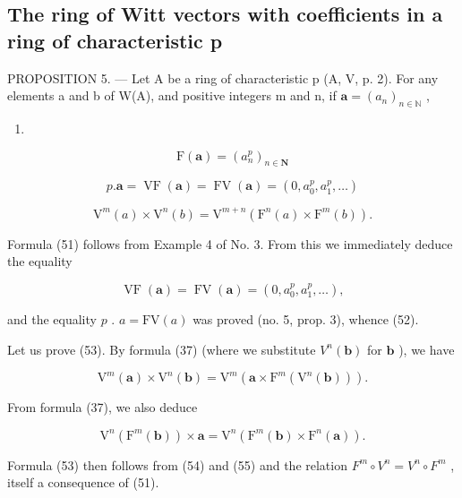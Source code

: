 \subsection{The ring of Witt vectors with coefficients in a ring of characteristic p}

PROPOSITION 5. --- Let A be a ring of characteristic p (A, V, p. 2). For any elements a and b of W(A), and positive integers m and n, if \(\boldsymbol{a} = (a_{n})_{n \in \mathbb{N}}\) ,

\begin{enumerate}
\def\labelenumi{(\arabic{enumi})}
\setcounter{enumi}{50}
\tightlist
\item
\end{enumerate}

\[
\mathrm{F} (\boldsymbol {a}) = (a _ {n} ^ {p}) _ {n \in \mathbf {N}}\tag{52}
\]

\[
p. \boldsymbol {a} = \operatorname{VF} (\boldsymbol {a}) = \operatorname{FV} (\boldsymbol {a}) = (0, a _ {0} ^ {p}, a _ {1} ^ {p}, \dots)\tag{53}
\]

\[
\mathrm{V} ^ {m} (a) \times \mathrm{V} ^ {n} (b) = \mathrm{V} ^ {m + n} (\mathrm{F} ^ {n} (a) \times \mathrm{F} ^ {m} (b)).
\]

Formula (51) follows from Example 4 of No. 3. From this we immediately deduce the equality

\[
\operatorname{VF} (\boldsymbol {a}) = \operatorname{FV} (\boldsymbol {a}) = (0, a _ {0} ^ {p}, a _ {1} ^ {p}, \dots),
\]

and the equality \(p\) . \(a = \text{FV}(a)\) was proved (no. 5, prop. 3), whence (52).

Let us prove (53). By formula (37) (where we substitute \(V^n(\boldsymbol{b})\) for \(\boldsymbol{b}\) ), we have

\[
\mathrm{V} ^ {m} (\boldsymbol {a}) \times \mathrm{V} ^ {n} (\boldsymbol {b}) = \mathrm{V} ^ {m} \left(\boldsymbol {a} \times \mathrm{F} ^ {m} \left(\mathrm{V} ^ {n} (\boldsymbol {b})\right)\right).\tag{54}
\]

From formula (37), we also deduce

\[
\mathrm{V} ^ {n} \left(\mathrm{F} ^ {m} (\boldsymbol {b})\right) \times \boldsymbol {a} = \mathrm{V} ^ {n} \left(\mathrm{F} ^ {m} (\boldsymbol {b}) \times \mathrm{F} ^ {n} (\boldsymbol {a})\right).\tag{55}
\]

Formula (53) then follows from (54) and (55) and the relation \(F^{m} \circ V^{n} = V^{n} \circ F^{m}\) , itself a consequence of (51).

